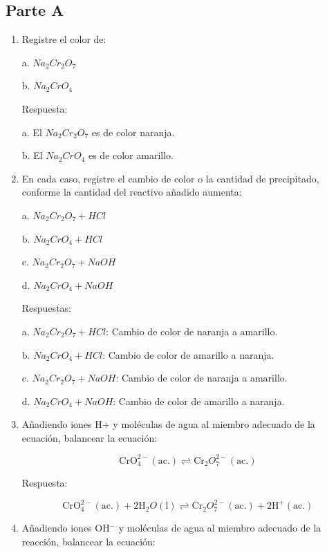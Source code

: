 \documentclass[11pt]{article}
\begin{document}
        \subsection{Parte A}
        \begin{enumerate}
            \item Registre el color de:
            
            a. $Na_2Cr_2O_7$

            b. $Na_2CrO_4$
            
            Respuesta:

            a. El $Na_2Cr_2O_7$ es de color naranja.

            b. El $Na_2CrO_4$ es de color amarillo.
            
            \item En cada caso, registre el cambio de color o la cantidad de precipitado, conforme la cantidad del reactivo añadido aumenta:
            
            a. $Na_2Cr_2O_7 + HCl$

            b. $Na_2CrO_4 + HCl$

            c. $Na_2Cr_2O_7 + NaOH$

            d. $Na_2CrO_4 + NaOH$
            
            Respuestas:

            a. $Na_2Cr_2O_7 + HCl$: Cambio de color de naranja a amarillo.

            b. $Na_2CrO_4 + HCl$: Cambio de color de amarillo a naranja.

            c. $Na_2Cr_2O_7 + NaOH$: Cambio de color de naranja a amarillo.

            d. $Na_2CrO_4 + NaOH$: Cambio de color de amarillo a naranja.
            
            \item Añadiendo iones H+ y moléculas de agua al miembro adecuado de la ecuación, balancear la ecuación:

            \[ \text{CrO}_4^{2-} (\text{ac.}) \rightleftharpoons \text{Cr}_2O_7^{2-} (\text{ac.}) \]
            
            Respuesta:

            \[ \text{CrO}_4^{2-} (\text{ac.}) + 2 \text{H}_2O (\text{l}) \rightleftharpoons \text{Cr}_2O_7^{2-} (\text{ac.}) + 2 \text{H}^+ (\text{ac.}) \]
            
            \item Añadiendo iones OH$^-$ y moléculas de agua al miembro adecuado de la reacción, balancear la ecuación:
            

\end{enumerate}
\end{document}
